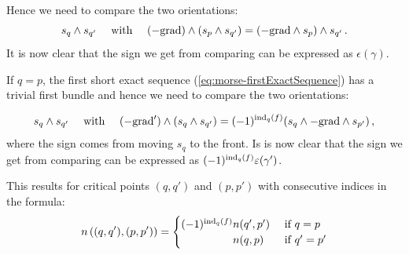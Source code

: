 \begin{definition}
	Hence we need to compare the two orientations:
	\begin{equation*}
		s_q \wedge s_{q'} \quad \text{ with }\quad (-\mathrm{grad} )\wedge ( s_p\wedge s_{q'})=(-\mathrm{grad}\wedge s_p)\wedge s_{q'}\,.
	\end{equation*}
	It is now clear that the sign we get from comparing can be expressed as $\epsilon{(\gamma)}$.

	If $q=p$,  the first short exact sequence (\ref{eq:morse-firstExactSequence}) has a trivial first bundle and hence we need to compare the two orientations:

	\begin{equation*}
		s_q \wedge s_{q'} \quad \text{ with }\quad (-\mathrm{grad}' )\wedge ( s_q\wedge s_{q'})=(-1)^{\mathrm{ind}_q(f)}(s_q\wedge -\mathrm{grad}\wedge s_{p'})\,,
	\end{equation*}where the sign comes from moving $s_q$ to the front. Is is now clear that the sign we get from comparing can be expressed as $(-1)^{\mathrm{ind}_q(f)}\varepsilon{(\gamma')}$.

This results for critical points $(q,q')$ and $(p,p')$ with consecutive indices in the formula:
	\begin{equation*}
		n\left((q,q'),(p,p') \right)=\begin{cases}
			(-1)^{\ind_q(f)}n(q',p') & \text{ if } q=p\\
			\phantom{(-1)^{\ind_q(f)}} n(q,p) & \text{ if } q'=p'			
		\end{cases}
	\end{equation*}
	\end{definition}


